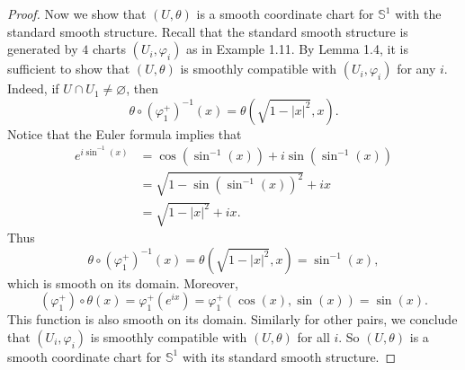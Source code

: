\documentclass[12pt, a4paper]{article}
\theoremstyle{plain}
\newcommand{\set}[1]{\mathbb{#1}}
\def\phi{\varphi}
\begin{document}
\begin{proof}
    Now we show that $(U,\theta)$ is a smooth coordinate chart for $\set{S}^1$ with the standard smooth structure. Recall that the standard smooth structure is generated by $4$ charts $(U_i,\phi_i)$ as in Example 1.11. By Lemma 1.4, it is sufficient to show that $(U,\theta)$ is smoothly compatible with $(U_i,\phi_i)$ for any $i$. Indeed, if $U\cap U_1\neq \varnothing$, then 
    \[
    \theta\circ(\phi_1^+)^{-1}(x)=\theta(\sqrt{1-|x|^2},x).
    \]
    Notice that the Euler formula implies that
    \begin{align*}
    e^{i\sin^{-1}(x)}&= \cos(\sin^{-1}(x)) + i\sin(\sin^{-1}(x))\\
    &= \sqrt{1-\sin(\sin^{-1}(x))^2}+ix\\
    &= \sqrt{1-|x|^2}+ix.
    \end{align*}
    Thus 
    \[
    \theta\circ (\phi_1^+)^{-1}(x)=\theta(\sqrt{1-|x|^2},x)=\sin^{-1}(x),
    \]
    which is smooth on its domain. Moreover,
    \[
    (\phi_1^+)\circ\theta(x) = \phi_1^+(e^{ix})=\phi_1^+(\cos(x),\sin(x))=\sin(x).
    \]
    This function is also smooth on its domain. Similarly for other pairs, we conclude that $(U_i,\phi_i)$ is smoothly compatible with $(U,\theta)$ for all $i$. So $(U,\theta)$ is a smooth coordinate chart for $\set{S}^1$ with its standard smooth structure.

    \end{proof}
\end{document}

